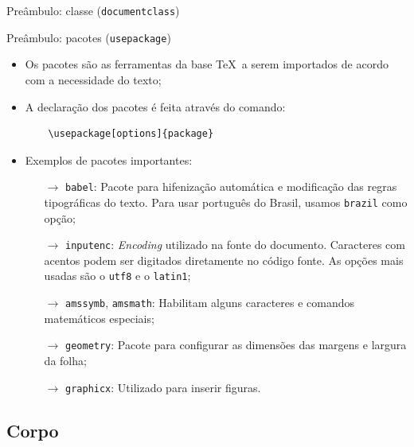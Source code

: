 \documentclass[c]{beamer}
\begin{document}
{\begin{frame}[fragile]{\sc Preâmbulo: classe (\texttt{documentclass})}
        \end{frame}
        
        \begin{frame}[fragile]{\sc Preâmbulo: pacotes (\texttt{usepackage})}
            
	        \begin{itemize}
		    \setlength\itemsep{0.2cm}
		        \item Os {\color{blue} pacotes} são as ferramentas da base \TeX\ a serem {\color{blue} importados} de acordo com a {\color{blue} necessidade} do texto;
		        \item  A {\color{blue} declaração} dos pacotes é feita através do {\color{blue} comando}:
		            \begin{verbatim}
    \usepackage[options]{package}
		            \end{verbatim}
		        \item {\color{blue} Exemplos} de pacotes importantes:
                \begin{itemize}
    	            \item[$\to$] \verb|babel|: Pacote para {\color{blue} hifenização} automática e modificação das {\color{blue} regras tipográficas} do texto. Para usar português do Brasil, usamos \texttt{brazil} como opção;
    	            \item[$\to$] \verb|inputenc|: \emph{{\color{blue} Encoding}} utilizado na fonte do documento. Caracteres com {\color{blue} acentos} podem ser digitados diretamente no código fonte. As opções mais usadas são o \verb|utf8| e o \verb|latin1|;
    	            \item[$\to$] \verb|amssymb|, \verb|amsmath|: Habilitam alguns {\color{blue} caracteres} e {\color{blue} comandos matemáticos} especiais;
    	            \item[$\to$] \verb|geometry|: Pacote para configurar as dimensões das {\color{blue} margens} e {\color{blue} largura} da folha;
		            \item[$\to$] \verb|graphicx|: Utilizado para inserir {\color{blue} figuras}.
		        \end{itemize}
	        \end{itemize}
	        
        \end{frame}
    
    \subsection{Corpo}
        
}
\end{document}
